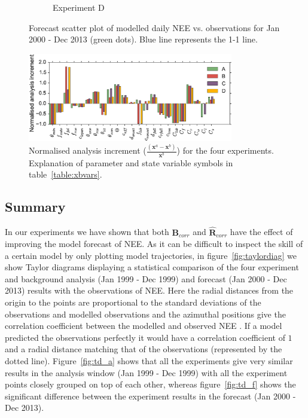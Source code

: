 \documentclass[review]{elsarticle}
\begin{document}
\begin{figure}
\begin{subfigure}[b]{0.49\textwidth}
        \caption{Experiment D}
        \label{fig:forecastscatedcBcorR}
    \end{subfigure}
    \caption{Forecast scatter plot of modelled daily NEE vs. observations for Jan 2000 - Dec 2013 (green dots). Blue line represents the 1-1 line.}\label{fig:animals}
\end{figure}

\begin{figure}[ht]
    \centering
    \includegraphics[width=0.8\textwidth]{inccvt.eps}
    \caption{Normalised analysis increment \big($\frac{(\textbf{x}^a - \textbf{x}^b)}{\textbf{x}^b}$\big) for the four experiments. Explanation of parameter and state variable symbols in table~\ref{table:xbvars}.}
    \label{fig:xa_inc}
\end{figure}

\subsection{Summary}

In our experiments we have shown that both $\textbf{B}_{corr}$ and $\hat{\textbf{R}}_{corr}$ have the effect of improving the model forecast of NEE. As it can be difficult to inspect the skill of a certain model by only plotting model trajectories, in figure~\ref{fig:taylordiag} we show Taylor diagrams displaying a statistical comparison of the four experiment and background analysis (Jan 1999 - Dec 1999) and forecast (Jan 2000 - Dec 2013) results with the observations of NEE. Here the radial distances from the origin to the points are proportional to the standard deviations of the observations and modelled observations and the azimuthal positions give the correlation coefficient between the modelled and observed NEE \citep{Taylor2001}. If a model predicted the observations perfectly it would have a correlation coefficient of $1$ and a radial distance matching that of the observations (represented by the dotted line). Figure~\ref{fig:td_a} shows that all the experiments give very similar results in the analysis window (Jan 1999 - Dec 1999) with all the experiment points closely grouped on top of each other, whereas figure~\ref{fig:td_f} shows the significant difference between the experiment results in the forecast (Jan 2000 - Dec 2013).
\end{document}
